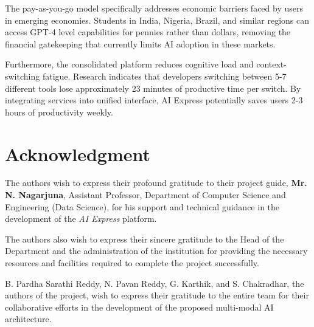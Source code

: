 \documentclass[conference]{IEEEtran}
\begin{document}
The pay-as-you-go model specifically addresses economic barriers faced by users in emerging economies. Students in India, Nigeria, Brazil, and similar regions can access GPT-4 level capabilities for pennies rather than dollars, removing the financial gatekeeping that currently limits AI adoption in these markets.

Furthermore, the consolidated platform reduces cognitive load and context-switching fatigue. Research indicates that developers switching between 5-7 different tools lose approximately 23 minutes of productive time per switch. By integrating services into unified interface, AI Express potentially saves users 2-3 hours of productivity weekly.

\section*{Acknowledgment}
The authors wish to express their profound gratitude to their project guide, \textbf{Mr. N. Nagarjuna}, Assistant Professor, Department of Computer Science and Engineering (Data Science), for his support and technical guidance in the development of the \textit{AI Express} platform. 

The authors also wish to express their sincere gratitude to the Head of the Department and the administration of the institution for providing the necessary resources and facilities required to complete the project successfully. 

B. Pardha Sarathi Reddy, N. Pavan Reddy, G. Karthik, and S. Chakradhar, the authors of the project, wish to express their gratitude to the entire team for their collaborative efforts in the development of the proposed multi-modal AI architecture.




\end{document}
